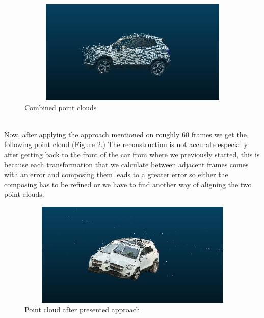 \documentclass{article}
\begin{document}
\begin{figure}[!ht]
\includegraphics[width=12cm,height=5cm,keepaspectratio]{images/combined_pcd.png}
\caption{Combined point clouds}
\label{fig:combined_point_cloud}
\end{figure}\\
\tab \tab Now, after applying the approach mentioned on roughly 60 frames we get the following point cloud (Figure \ref{fig:final_point_cloud}.) The reconstruction is not accurate especially after getting back to the front of the car from where we previously started, this is because each transformation that we calculate between adjacent frames comes with an error and composing them leads to a greater error so either the composing has to be refined or we have to find another way of aligning the two point clouds. 
\begin{figure}[!ht]
\includegraphics[width=12cm,height=5cm,keepaspectratio]{images/final_pcd_approach_1.png}
\caption{Point cloud after presented approach}
\label{fig:final_point_cloud}
\end{figure}\\
\pagebreak
\printbibliography
\end{document}
